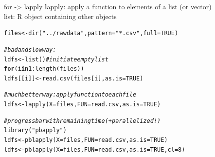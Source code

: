 \documentclass[xcolor=table,      handout ,    xcolor=dvipsnames]{beamer}\usepackage[]{graphicx}\usepackage[]{color}
\makeatletter
\newcommand{\hlnum}[1]{\textcolor[rgb]{0,0,0}{#1}}
\newcommand{\hlstr}[1]{\textcolor[rgb]{0.545,0.137,0.137}{#1}}
\newcommand{\hlcom}[1]{\textcolor[rgb]{0,0.392,0}{\textit{#1}}}
\newcommand{\hlopt}[1]{\textcolor[rgb]{0,0,0}{#1}}
\newcommand{\hlstd}[1]{\textcolor[rgb]{0,0,0}{#1}}
\newcommand{\hlkwa}[1]{\textcolor[rgb]{1,0,0}{\textbf{#1}}}
\newcommand{\hlkwb}[1]{\textcolor[rgb]{0,0,0}{#1}}
\newcommand{\hlkwc}[1]{\textcolor[rgb]{1,0,1}{#1}}
\newcommand{\hlkwd}[1]{\textcolor[rgb]{0,0,1}{#1}}
\newenvironment{kframe}{%
 \def\at@end@of@kframe{}%
 \ifinner\ifhmode%
  \def\at@end@of@kframe{\end{minipage}}%
  \begin{minipage}{\columnwidth}%
 \fi\fi%
 \def\FrameCommand##1{\hskip\@totalleftmargin \hskip-\fboxsep
 \colorbox{shadecolor}{##1}\hskip-\fboxsep
     \hskip-\linewidth \hskip-\@totalleftmargin \hskip\columnwidth}%
 \MakeFramed {\advance\hsize-\width
   \@totalleftmargin\z@ \linewidth\hsize
   \@setminipage}}%
 {\par\unskip\endMakeFramed%
 \at@end@of@kframe}
\newenvironment{knitrout}{}{} %
\makeatother
\begin{document}
\begin{frame}[fragile]{for -> lapply}
\textbf{l}apply: apply a function to elements of a list (or vector)\\
list: R object containing other objects
\pause \vspace{-1em}
\begin{knitrout}
\color{fgcolor}\begin{kframe}
\begin{alltt}
\hlstd{files} \hlkwb{<-} \hlkwd{dir}\hlstd{(}\hlstr{"../rawdata"}\hlstd{,} \hlkwc{pattern}\hlstd{=}\hlstr{"*.csv"}\hlstd{,} \hlkwc{full}\hlstd{=}\hlnum{TRUE}\hlstd{)}
\end{alltt}
\end{kframe}
\end{knitrout}
\pause \vspace{-1em}
\begin{knitrout}
\color{fgcolor}\begin{kframe}
\begin{alltt}
\hlcom{# bad and slow way:}
\hlstd{ldfs} \hlkwb{<-} \hlkwd{list}\hlstd{()} \hlcom{# initiate empty list}
\hlkwa{for}\hlstd{(i} \hlkwa{in} \hlnum{1}\hlopt{:}\hlkwd{length}\hlstd{(files))}
   \hlstd{ldfs[[i]]} \hlkwb{<-} \hlkwd{read.csv}\hlstd{(files[i],} \hlkwc{as.is}\hlstd{=}\hlnum{TRUE}\hlstd{)}
\end{alltt}
\end{kframe}
\end{knitrout}
\pause \vspace{-1em}
\begin{knitrout}
\color{fgcolor}\begin{kframe}
\begin{alltt}
\hlcom{# much better way: apply function to each file}
\hlstd{ldfs} \hlkwb{<-} \hlkwd{lapply}\hlstd{(}\hlkwc{X}\hlstd{=files,} \hlkwc{FUN}\hlstd{=read.csv,} \hlkwc{as.is}\hlstd{=}\hlnum{TRUE}\hlstd{)}
\end{alltt}
\end{kframe}
\end{knitrout}
\pause \vspace{-1em}
\begin{knitrout}
\color{fgcolor}\begin{kframe}
\begin{alltt}
\hlcom{# progress bar with remaining time (+ parallelized!)}
\hlkwd{library}\hlstd{(}\hlstr{"pbapply"}\hlstd{)}
\hlstd{ldfs} \hlkwb{<-} \hlkwd{pblapply}\hlstd{(}\hlkwc{X}\hlstd{=files,} \hlkwc{FUN}\hlstd{=read.csv,} \hlkwc{as.is}\hlstd{=}\hlnum{TRUE}\hlstd{)}
\hlstd{ldfs} \hlkwb{<-} \hlkwd{pblapply}\hlstd{(}\hlkwc{X}\hlstd{=files,} \hlkwc{FUN}\hlstd{=read.csv,} \hlkwc{as.is}\hlstd{=}\hlnum{TRUE}\hlstd{,} \hlkwc{cl}\hlstd{=}\hlnum{8}\hlstd{)}
\end{alltt}
\end{kframe}
\end{knitrout}
\end{frame}
\end{document}
